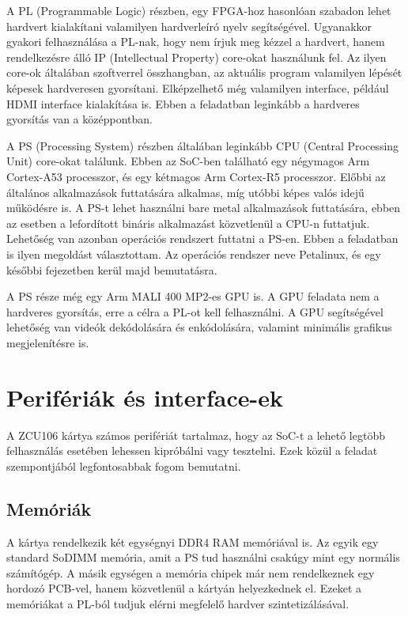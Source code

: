 A PL (Programmable Logic) részben, egy FPGA-hoz hasonlóan szabadon lehet hardvert kialakítani valamilyen hardverleíró nyelv segítségével. Ugyanakkor gyakori felhasználása a PL-nak, hogy nem írjuk meg kézzel a hardvert, hanem rendelkezésre álló IP (Intellectual Property) core-okat használunk fel. Az ilyen core-ok általában szoftverrel összhangban, az aktuális program valamilyen lépését képesek hardveresen gyorsítani. Elképzelhető még valamilyen interface, például HDMI interface kialakítása is. Ebben a feladatban leginkább a hardveres gyorsítás van a középpontban.

A PS (Processing System) részben általában leginkább CPU (Central Processing Unit) core-okat találunk. Ebben az SoC-ben található egy négymagos Arm Cortex-A53 processzor, és egy kétmagos Arm Cortex-R5 processzor. Előbbi az általános alkalmazások futtatására alkalmas, míg utóbbi képes valós idejű működésre is. A PS-t lehet használni bare metal alkalmazások futtatására, ebben az esetben a lefordított bináris alkalmazást közvetlenül a CPU-n futtatjuk. Lehetőség van azonban operációs rendszert futtatni a PS-en. Ebben a feladatban is ilyen megoldást választottam. Az operációs rendszer neve Petalinux, és egy későbbi fejezetben kerül majd bemutatásra.

A PS része még egy Arm MALI 400 MP2-es GPU is. A GPU feladata nem a hardveres gyorsítás, erre a célra a PL-ot kell felhasználni. A GPU segítségével lehetőség van videók dekódolására és enkódolására, valamint minimális grafikus megjelenítésre is.

\section{Perifériák és interface-ek}
A ZCU106 kártya számos perifériát tartalmaz, hogy az SoC-t a lehető legtöbb felhasználás esetében lehessen kipróbálni vagy tesztelni. Ezek közül a feladat szempontjából legfontosabbak fogom bemutatni.

\subsection{Memóriák}
A kártya rendelkezik két egységnyi DDR4 RAM memóriával is. Az egyik egy standard SoDIMM memória, amit a PS tud használni csakúgy mint egy normális számítógép. A másik egységen a memória chipek már nem rendelkeznek egy hordozó PCB-vel, hanem közvetlenül a kártyán helyezkednek el. Ezeket a memóriákat a PL-ból tudjuk elérni megfelelő hardver szintetizálásával.

